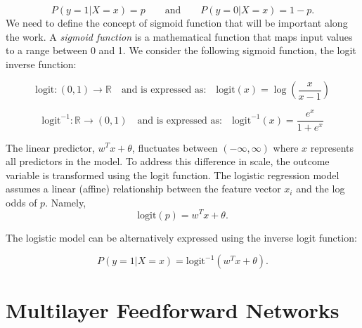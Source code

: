 \documentclass[../main.tex]{subfiles}
\begin{document}
\[P(y = 1 | X = x) = p 
\qquad  \text{and}
\qquad
P(y = 0 | X = x) = 1-p. \]
We need to define the concept of sigmoid function that will be important along the work. A \textit{sigmoid function} is a mathematical function that maps input values to a range between 0 and 1. We consider the following sigmoid function, the logit inverse function:

\[
\text{logit}: (0,1) \to \mathbb{R}
\quad \text{and is expressed as:} \quad
\text{logit}(x) = \log\left(\frac{x}{x-1}\right)
\]


\[
\text{logit}^{-1}: \mathbb{R} \to (0,1)
\quad \text{and is expressed as:} \quad
\text{logit}^{-1}(x) = \frac{e^x}{1+e^x}
\]

\noindent The linear predictor, $ w^T x +\theta$, fluctuates between $(-\infty,\infty)$ where $x$ represents all predictors in the model. To address this difference in scale, the outcome variable is transformed using the logit function. The logistic regression model assumes a linear (affine) relationship between the feature vector $x_i$ and the log odds of $p$. Namely,
$$\text{logit}(p) = w^T x +\theta.$$

\noindent The logistic model can be alternatively expressed using the inverse logit function:

\[
P(y = 1 | X=x) = \text{logit}^{-1}(w^T x +\theta).
\]




\section{Multilayer Feedforward Networks}
	
\end{document}

